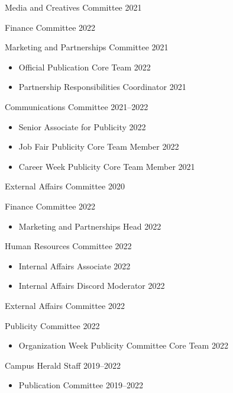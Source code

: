\documentclass[10pt,a4paper]{article}
\begin{document}
Media and Creatives Committee \hfill 2021\par
Finance Committee \hfill 2022

Marketing and Partnerships Committee \hfill 2021
\begin{itemize}
    \item Official Publication Core Team \hfill 2022
    \item Partnership Responsibilities Coordinator \hfill 2021
\end{itemize}

Communications Committee \hfill 2021--2022
\begin{itemize}
    \item Senior Associate for Publicity \hfill 2022
    \item Job Fair Publicity Core Team Member \hfill 2022
    \item Career Week Publicity Core Team Member \hfill 2021
\end{itemize}

External Affairs Committee \hfill 2020\par
Finance Committee \hfill 2022
\begin{itemize}
    \item Marketing and Partnerships Head \hfill 2022
\end{itemize}
Human Resources Committee \hfill 2022
\begin{itemize}
    \item Internal Affairs Associate \hfill 2022
    \item Internal Affairs Discord Moderator \hfill 2022
\end{itemize}

External Affairs Committee \hfill 2022\par
Publicity Committee \hfill 2022
\begin{itemize}
    \item Organization Week Publicity Committee Core Team \hfill 2022
\end{itemize}

Campus Herald Staff \hfill 2019--2022
\begin{itemize}
    \item Publication Committee \hfill 2019--2022
\end{itemize}
\end{document}
